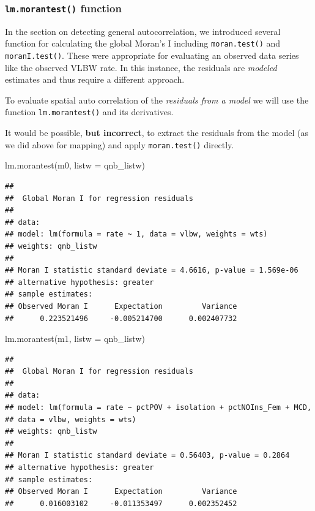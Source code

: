\documentclass[
]{book}
\newenvironment{Shaded}{\begin{snugshade}}{\end{snugshade}}
\newcommand{\AttributeTok}[1]{\textcolor[rgb]{0.77,0.63,0.00}{#1}}
\newcommand{\FunctionTok}[1]{\textcolor[rgb]{0.00,0.00,0.00}{#1}}
\newcommand{\NormalTok}[1]{#1}
\newenvironment{rmdcaution}[1]
  {
  \begin{itemize}
  \renewcommand{\labelitemi}{
    \raisebox{-.7\height}[0pt][0pt]{
      {\setkeys{Gin}{width=3em,keepaspectratio}\texttt{[image: images/\#1]}}
    }
  }
  \setlength{\fboxsep}{1em}
  \begin{caution}
  \item
  }
  {
  \end{caution}
  \end{itemize}
  }
\begin{document}
\hypertarget{lm.morantest-function}{%
\subsubsection{\texorpdfstring{\texttt{lm.morantest()} function}{lm.morantest() function}}\label{lm.morantest-function}}

In the section on detecting general autocorrelation, we introduced several function for calculating the global Moran's I including \texttt{moran.test()} and \texttt{moranI.test()}. These were appropriate for evaluating an observed data series like the observed VLBW rate. In this instance, the residuals are \emph{modeled} estimates and thus require a different approach.

To evaluate spatial auto correlation of the \emph{residuals from a model} we will use the function \texttt{lm.morantest()} and its derivatives.

\begin{rmdcaution}{caution}
It would be possible, \textbf{but incorrect}, to extract the residuals from the model (as we did above for mapping) and apply \texttt{moran.test()} directly.

\end{rmdcaution}

\begin{Shaded}
\begin{Highlighting}[]
\FunctionTok{lm.morantest}\NormalTok{(m0, }\AttributeTok{listw =}\NormalTok{ qnb\_listw)}
\end{Highlighting}
\end{Shaded}

\begin{verbatim}
## 
##  Global Moran I for regression residuals
## 
## data:  
## model: lm(formula = rate ~ 1, data = vlbw, weights = wts)
## weights: qnb_listw
## 
## Moran I statistic standard deviate = 4.6616, p-value = 1.569e-06
## alternative hypothesis: greater
## sample estimates:
## Observed Moran I      Expectation         Variance 
##      0.223521496     -0.005214700      0.002407732
\end{verbatim}

\begin{Shaded}
\begin{Highlighting}[]
\FunctionTok{lm.morantest}\NormalTok{(m1, }\AttributeTok{listw =}\NormalTok{ qnb\_listw)}
\end{Highlighting}
\end{Shaded}

\begin{verbatim}
## 
##  Global Moran I for regression residuals
## 
## data:  
## model: lm(formula = rate ~ pctPOV + isolation + pctNOIns_Fem + MCD,
## data = vlbw, weights = wts)
## weights: qnb_listw
## 
## Moran I statistic standard deviate = 0.56403, p-value = 0.2864
## alternative hypothesis: greater
## sample estimates:
## Observed Moran I      Expectation         Variance 
##      0.016003102     -0.011353497      0.002352452
\end{verbatim}
\end{document}
